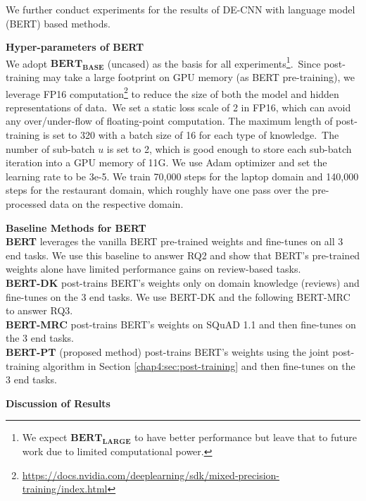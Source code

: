 We further conduct experiments for the results of DE-CNN with language model (BERT) based methods.

\textbf{Hyper-parameters of BERT}\\
\label{chap6:sec:hyp}
We adopt $\textbf{BERT}_\textbf{BASE}$ (uncased) as the basis for all experiments\footnote{We expect $\textbf{BERT}_\textbf{LARGE}$ to have better performance but leave that to future work due to limited computational power.}.~Since post-training may take a large footprint on GPU memory (as BERT pre-training), we leverage FP16 computation\footnote{\url{https://docs.nvidia.com/deeplearning/sdk/mixed-precision-training/index.html}} to reduce the size of both the model and hidden representations of data.~We set a static loss scale of 2 in FP16, which can avoid any over/under-flow of floating-point computation.
The maximum length of post-training is set to 320 with a batch size of 16 for each type of knowledge.~The number of sub-batch $u$ is set to 2, which is good enough to store each sub-batch iteration into a GPU memory of 11G. We use Adam optimizer and set the learning rate to be 3e-5.
We train 70,000 steps for the laptop domain and 140,000 steps for the restaurant domain, which roughly have one pass over the pre-processed data on the respective domain.

\textbf{Baseline Methods for BERT}\\
\textbf{BERT} leverages the vanilla BERT pre-trained weights and fine-tunes on all 3 end tasks. We use this baseline to answer RQ2 and show that BERT's pre-trained weights alone have limited performance gains on review-based tasks.\\
\textbf{BERT-DK} post-trains BERT's weights only on domain knowledge (reviews) and fine-tunes on the 3 end tasks. We use BERT-DK and the following BERT-MRC to answer RQ3.\\
\textbf{BERT-MRC} post-trains BERT's weights on SQuAD 1.1 and then fine-tunes on the 3 end tasks.\\
\textbf{BERT-PT} (proposed method) post-trains BERT's weights using the joint post-training algorithm in Section \ref{chap4:sec:post-training} and then fine-tunes on the 3 end tasks.

\textbf{Discussion of Results}

